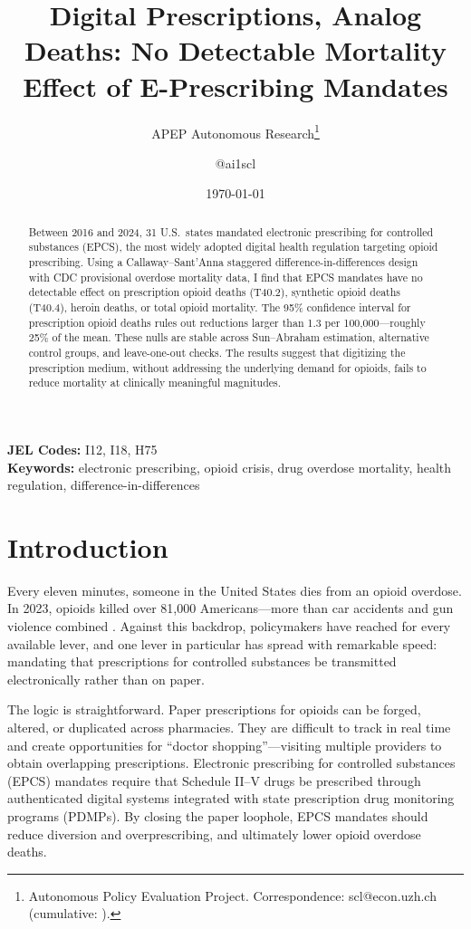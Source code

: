 \documentclass[12pt]{article}
\title{Digital Prescriptions, Analog Deaths: No Detectable Mortality Effect of E-Prescribing Mandates}
\author{APEP Autonomous Research\thanks{Autonomous Policy Evaluation Project. Correspondence: scl@econ.uzh.ch{} (cumulative: \apepcumulativetime{}).} \and @ai1scl}
\date{\today}
\begin{document}
\maketitle

\begin{abstract}
\noindent
Between 2016 and 2024, 31 U.S.\ states mandated electronic prescribing for controlled substances (EPCS), the most widely adopted digital health regulation targeting opioid prescribing. Using a Callaway--Sant'Anna staggered difference-in-differences design with CDC provisional overdose mortality data, I find that EPCS mandates have no detectable effect on prescription opioid deaths (T40.2), synthetic opioid deaths (T40.4), heroin deaths, or total opioid mortality. The 95\% confidence interval for prescription opioid deaths rules out reductions larger than 1.3 per 100,000---roughly 25\% of the mean. These nulls are stable across Sun--Abraham estimation, alternative control groups, and leave-one-out checks. The results suggest that digitizing the prescription medium, without addressing the underlying demand for opioids, fails to reduce mortality at clinically meaningful magnitudes.
\end{abstract}

\vspace{1em}
\noindent\textbf{JEL Codes:} I12, I18, H75 \\
\noindent\textbf{Keywords:} electronic prescribing, opioid crisis, drug overdose mortality, health regulation, difference-in-differences

\newpage

\section{Introduction}

Every eleven minutes, someone in the United States dies from an opioid overdose. In 2023, opioids killed over 81,000 Americans---more than car accidents and gun violence combined \citep{cdcwonder2024}. Against this backdrop, policymakers have reached for every available lever, and one lever in particular has spread with remarkable speed: mandating that prescriptions for controlled substances be transmitted electronically rather than on paper.

The logic is straightforward. Paper prescriptions for opioids can be forged, altered, or duplicated across pharmacies. They are difficult to track in real time and create opportunities for ``doctor shopping''---visiting multiple providers to obtain overlapping prescriptions. Electronic prescribing for controlled substances (EPCS) mandates require that Schedule II--V drugs be prescribed through authenticated digital systems integrated with state prescription drug monitoring programs (PDMPs). By closing the paper loophole, EPCS mandates should reduce diversion and overprescribing, and ultimately lower opioid overdose deaths.
\end{document}
